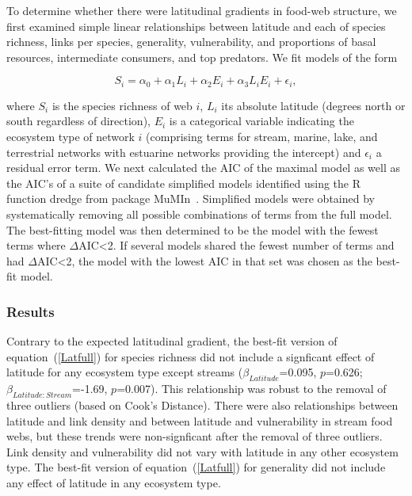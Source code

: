 \documentclass[12pt]{article}
\begin{document}
    To determine whether there were latitudinal gradients in food-web structure,
    we first examined simple linear relationships between latitude and each of 
    species richness, links per species, generality, vulnerability, and proportions
    of basal resources, intermediate consumers, and top predators. We fit models of the form

    \begin{equation}
    \label{Latfull}
    S_{i} = \alpha_{0} + \alpha_{1} L_{i} + \alpha_{2} E_{i} + \alpha_{3} L_{i} E_{i} + \epsilon_{i} ,
    \end{equation}

    \noindent where $S_{i}$ is the species richness of web $i$, $L_{i}$ its absolute
    latitude (degrees north or south  regardless of direction), $E_{i}$ is a categorical
    variable indicating the ecosystem type of network $i$ (comprising terms for stream, 
    marine, lake, and terrestrial networks with estuarine
    networks providing the intercept) and $\epsilon_{i}$ a residual error term. 
    We next calculated the AIC
    of the maximal model as well as the AIC's of a suite of candidate simplified models identified
    using the R~\citep{R} function dredge from package MuMIn~\citep{MuMIn}. 
    Simplified models were obtained by
    systematically removing all possible combinations of terms from the full model.
    The best-fitting model was then determined to be the model with the fewest terms 
    where $\Delta$AIC\textless2. If several models shared the fewest number of terms 
    and had $\Delta$AIC\textless2, the model with the lowest AIC in that set was chosen as the best-fit
    model.


  \subsubsection*{Results}
    Contrary to the expected latitudinal gradient, the best-fit version of
    equation~(\ref{Latfull}) for species richness did not include a signficant effect of latitude for any ecosystem type except streams
    ($\beta_{Latitude}$=0.095, $p$=0.626; $\beta_{Latitude:Stream}$=-1.69, $p$=0.007).  This
    relationship was robust to the removal of three outliers (based on Cook's Distance). 
    There were also relationships between latitude and link density and between latitude and vulnerability
    in stream food webs, but these trends were non-signficant after the removal of three outliers.
    Link density and vulnerability did not vary with latitude in any other ecosystem type.
    The best-fit version of equation~(\ref{Latfull}) for generality did not include any effect of
    latitude in any ecosystem type. 
\end{document}

